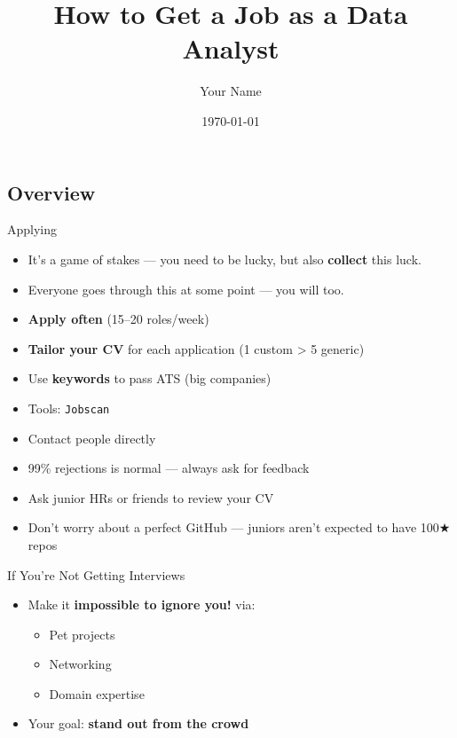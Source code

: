 \documentclass[10pt,a4paper]{article}
\title{How to Get a Job as a \textbf{Data Analyst}}
\author{Your Name}
\date{\today}
\begin{document}
\small
\begin{multicols}{3}

\maketitle
\thispagestyle{empty}
\scriptsize

\section{Overview}

\begin{textbox}{Applying}

\begin{itemize}
    \item It's a game of stakes — you need to be lucky, but also \textbf{collect} this luck.
    \item Everyone goes through this at some point — you will too.
    \item \textbf{Apply often} (15–20 roles/week)
    \item \textbf{Tailor your CV} for each application (1 custom > 5 generic)
    \item Use \textbf{keywords} to pass ATS (big companies)
    \item Tools: \texttt{Jobscan}
    \item Contact people directly
    \item 99\% rejections is normal — always ask for feedback
    \item Ask junior HRs or friends to review your CV
    \item Don't worry about a perfect GitHub — juniors aren’t expected to have 100★ repos
\end{itemize}

\end{textbox}

\begin{textbox}{If You're Not Getting Interviews}
\begin{itemize}
    \item Make it \textbf{impossible to ignore you!} via:
    \begin{itemize}
        \item Pet projects
        \item Networking
        \item Domain expertise
    \end{itemize}
    \item Your goal: \textbf{stand out from the crowd}
\end{itemize}
\end{textbox}


\end{multicols}
\end{document}
